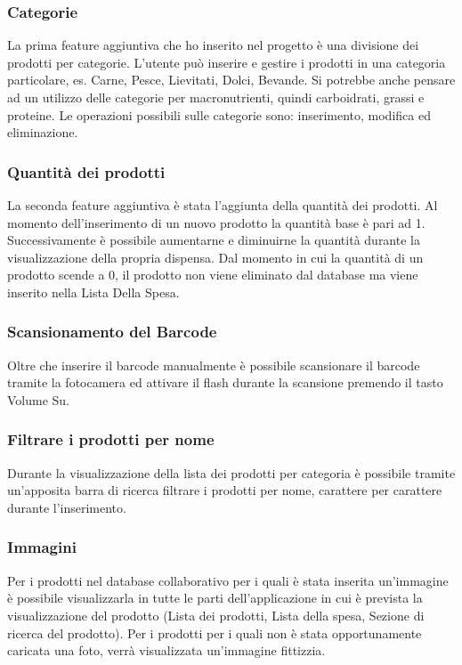 \documentclass[11pt]{article}
\begin{document}
    \subsubsection{Categorie}
    La prima feature aggiuntiva che ho inserito nel progetto è una divisione dei prodotti per categorie. L'utente può inserire e gestire i
    prodotti in una categoria particolare, es. Carne, Pesce, Lievitati, Dolci, Bevande. Si potrebbe anche pensare ad un utilizzo delle categorie per 
    macronutrienti, quindi carboidrati, grassi e proteine. Le operazioni possibili sulle categorie sono: inserimento, modifica ed eliminazione.
    \subsubsection{Quantità dei prodotti}
    La seconda feature aggiuntiva è stata l'aggiunta della quantità dei prodotti. Al momento dell'inserimento di un nuovo prodotto la quantità
    base è pari ad 1. Successivamente è possibile aumentarne e diminuirne la quantità durante la visualizzazione della propria dispensa.
    Dal momento in cui la quantità di un prodotto scende a 0, il prodotto non viene eliminato dal database ma viene inserito nella Lista Della Spesa.
    \subsubsection{Scansionamento del Barcode}
    Oltre che inserire il barcode manualmente è possibile scansionare il barcode tramite la fotocamera ed attivare il flash durante la scansione
    premendo il tasto Volume Su.
    \subsubsection{Filtrare i prodotti per nome}
    Durante la visualizzazione della lista dei prodotti per categoria è possibile tramite un'apposita barra di ricerca filtrare i prodotti 
    per nome, carattere per carattere durante l'inserimento. 
    \subsubsection{Immagini}
    Per i prodotti nel database collaborativo per i quali è stata inserita un'immagine è possibile visualizzarla in tutte le parti dell'applicazione 
    in cui è prevista la visualizzazione del prodotto (Lista dei prodotti, Lista della spesa, Sezione di ricerca del prodotto). Per i prodotti
    per i quali non è stata opportunamente caricata una foto, verrà visualizzata un'immagine fittizzia.
\end{document}
